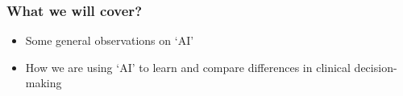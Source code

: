 \begin{frame}
\frametitle{What we will cover?}
\Large
\begin{itemize}
    \setlength{\itemsep}{5mm}
    \item Some general observations on `AI'
    \item How we are using `AI' to learn and compare differences in clinical decision-making
    
\end{itemize}

\end{frame}